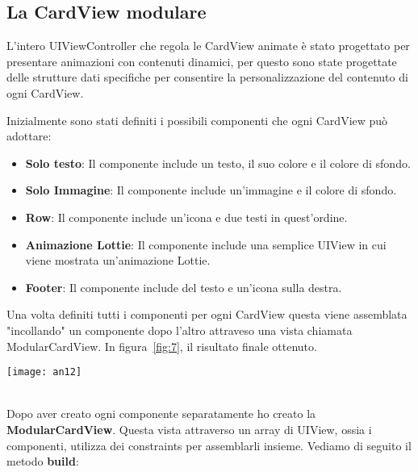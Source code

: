 \subsection{La CardView modulare}

L'intero UIViewController che regola le CardView animate è stato progettato per presentare 
animazioni con contenuti dinamici, per questo sono state progettate delle strutture dati specifiche per consentire la personalizzazione
del contenuto di ogni CardView. 

Inizialmente sono stati definiti i possibili componenti che ogni CardView può adottare:
\begin{itemize}
    \item\textbf{Solo testo}: Il componente include un testo, il suo colore e il colore di sfondo.
    \item\textbf{Solo Immagine}: Il componente include un'immagine e il colore di sfondo.
    \item\textbf{Row}: Il componente include un'icona e due testi in quest'ordine.
    \item\textbf{Animazione Lottie\cite{lottie}}: Il componente include una semplice UIView in cui viene mostrata un'animazione Lottie.
    \item\textbf{Footer}: Il componente include del testo e un'icona sulla destra.
\end{itemize}

Una volta definiti tutti i componenti per ogni CardView questa viene assemblata "incollando" un componente
dopo l'altro attraveso una vista chiamata ModularCardView. In figura~\ref{fig:7}, il risultato finale ottenuto. \\

\begin{minipage}{\linewidth}
    \centering
    \texttt{[image: an12]}
    \label{fig:7}
\end{minipage}\\

Dopo aver creato ogni componente separatamente ho creato la \textbf{ModularCardView}.
Questa vista attraverso un array di UIView, ossia i componenti, utilizza dei constraints 
per assemblarli insieme. Vediamo di seguito il metodo \textbf{build}:

